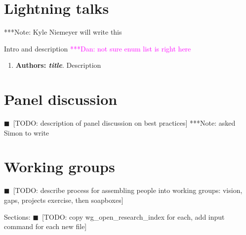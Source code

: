 \documentclass[11pt, oneside]{amsart}
\newcommand{\todo}[1]{{\color{blue}$\blacksquare$~\textsf{[TODO: #1]}}}
\newcommand{\note}[1]{ {\textcolor{blueish}    { ***Note:      #1 }}}
\newcommand{\katznote}[1]{ {\textcolor{magenta}    { ***Dan:      #1 }}}
\begin{document}
\section{Lightning talks} \label{sec:lightning}
\begin{comment}
\note{
\href{http://wssspe.researchcomputing.org.uk/wssspe4/agenda/}{Slides.}}
\end{comment}

\note{Kyle Niemeyer will write this}

Intro and description \katznote{not sure enum list is right here}
%
\begin{enumerate}
\item \textbf{Authors: \emph{title}}.
Description

\end{enumerate}

\section{Panel discussion} \label{sec:panel}

\todo{description of panel discussion on best practices} \note{asked Simon to write}

\section{Working groups} \label{sec:WGs}

\todo{describe process for assembling people into working groups: vision, gaps, projects exercise, then soapboxes}

Sections: \todo{copy wg\_open\_research\_index for each, add input command for each new file}
\end{document}

